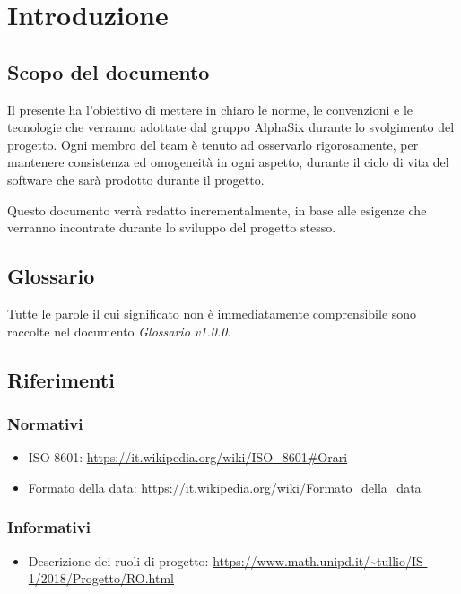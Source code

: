 \section{Introduzione}

\subsection{Scopo del documento}
    Il presente  ha l’obiettivo di mettere in chiaro le norme, le convenzioni e le tecnologie
    che verranno adottate dal gruppo AlphaSix durante lo svolgimento del progetto\GAlt. Ogni membro del team
    \`e tenuto ad osservarlo rigorosamente, per mantenere consistenza ed omogeneit\`a in ogni aspetto, durante il ciclo di
    vita del software che sarà prodotto durante il progetto.\par
    Questo documento verr\`a redatto incrementalmente, in base alle esigenze che verranno incontrate durante lo sviluppo del
    progetto stesso.
    

\subsection{Glossario}
    Tutte le parole il cui significato non è immediatamente comprensibile sono raccolte nel documento \textit{Glossario v1.0.0}\DAlt. 

\subsection{Riferimenti}

    \subsubsection{Normativi}	\label{rifnorma}
    \begin{itemize}
    	\item ISO 8601: \url{https://it.wikipedia.org/wiki/ISO\_8601#Orari}
    	\item Formato della data: \url{https://it.wikipedia.org/wiki/Formato\_della\_data}
    \end{itemize}

    \subsubsection{Informativi}	\label{rifinfo}    
    \begin{itemize}
        \item Descrizione dei ruoli di progetto: \url{https://www.math.unipd.it/~tullio/IS-1/2018/Progetto/RO.html}
        
	\end{itemize}    
